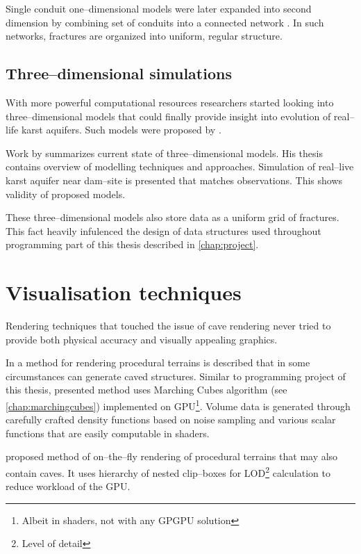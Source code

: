 Single conduit one--dimensional models were later expanded into second dimension
by combining set of conduits into a connected network \parencite[pp. 4--5]{hiller2013}.
In such networks, fractures are organized into uniform, regular structure.

\subsection{Three--dimensional simulations}

With more powerful computational resources researchers started looking into
three--dimensional models that could finally provide insight into evolution
of real--life karst aquifers. Such models were proposed by
\cites{annable2003}{WRCR:WRCR9525}{Kaufmann2010241}.

Work by \cite{hiller2013} summarizes current state of three--dimensional models.
His thesis contains overview of modelling techniques and approaches. Simulation
of real--live karst aquifer near dam--site is presented that matches
observations. This shows validity of proposed models.

These three--dimensional models also store data as a uniform grid of fractures.
This fact heavily infulenced the design of data structures used throughout
programming part of this thesis described in \autoref{chap:project}.

\section{Visualisation techniques}

Rendering techniques that touched the issue of cave rendering never tried to
provide both physical accuracy and visually appealing graphics.

In \cite{gpugems3ch01} a method for rendering procedural terrains is described
that in some circumstances can generate caved structures. Similar to programming
project of this thesis, presented method uses Marching Cubes algorithm
(see \autoref{chap:marchingcubes}) implemented on GPU\footnote{Albeit in shaders,
not with any GPGPU solution}. Volume data is generated through carefully crafted
density functions based on noise sampling and various scalar
functions that are easily computable in shaders.

\Cite{forstmann2005} proposed method of on--the--fly rendering of procedural
terrains that may also contain caves. It uses hierarchy of nested clip--boxes
for LOD\footnote{Level of detail} calculation to reduce workload of the GPU.

